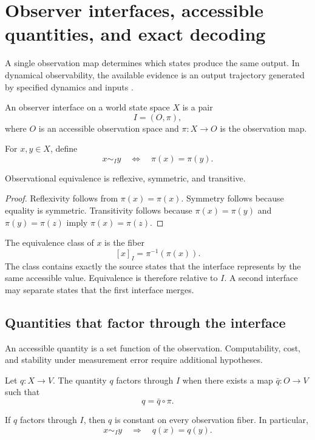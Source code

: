 \section{Observer interfaces, accessible quantities, and exact decoding}
\label{sec:interfaces}

A single observation map determines which states produce the same output. In dynamical observability, the available evidence is an output trajectory generated by specified dynamics and inputs \parencite{Kalman1963,HermannKrener1977,Sontag1998}.

\begin{definition}
An observer interface on a world state space \(X\) is a pair
\[
I=(O,\pi),
\]
where \(O\) is an accessible observation space and \(\pi:X\to O\) is the observation map.
\end{definition}
\begin{definition}
For \(x,y\in X\), define
\[
x\sim_I y
\quad\Longleftrightarrow\quad
\pi(x)=\pi(y).
\]
\end{definition}
\begin{proposition}
Observational equivalence is reflexive, symmetric, and transitive.
\end{proposition}

\begin{proof}
Reflexivity follows from \(\pi(x)=\pi(x)\). Symmetry follows because equality is symmetric. Transitivity follows because \(\pi(x)=\pi(y)\) and \(\pi(y)=\pi(z)\) imply \(\pi(x)=\pi(z)\).
\end{proof}
The equivalence class of \(x\) is the fiber
\[
[x]_I=\pi^{-1}(\pi(x)).
\]
The class contains exactly the source states that the interface represents by the same accessible value. Equivalence is therefore relative to \(I\). A second interface may separate states that the first interface merges.

\subsection{Quantities that factor through the interface}

An accessible quantity is a set function of the observation. Computability, cost, and stability under measurement error require additional hypotheses.

\begin{definition}
Let \(q:X\to V\). The quantity \(q\) factors through \(I\) when there exists a map \(\bar q:O\to V\) such that
\[
q=\bar q\circ\pi.
\]
\end{definition}
\begin{theorem}
If \(q\) factors through \(I\), then \(q\) is constant on every observation fiber. In particular,
\[
x\sim_I y
\quad\Longrightarrow\quad
q(x)=q(y).
\]
\end{theorem}

